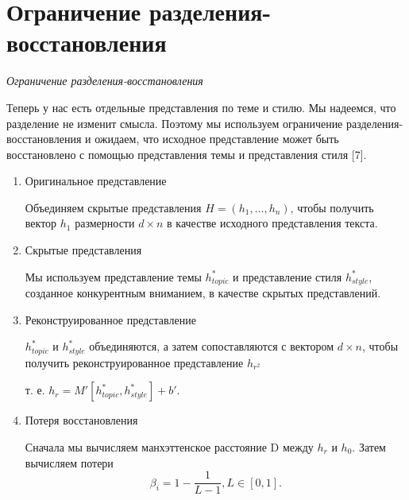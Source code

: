 \documentclass{article}
\begin{document}
\section{Ограничение разделения-восстановления}
\begin{center}
\emph{Ограничение разделения-восстановления}
\end{center}

Теперь у нас есть отдельные представления по теме и стилю. Мы надеемся, 
что разделение не изменит смысла. 
Поэтому мы используем ограничение разделения-восстановления и ожидаем, что исходное 
представление может быть восстановлено с помощью представления темы и представления стиля [7].
\begin{enumerate}[label={\arabic*)}, left=10pt]
    \item Оригинальное представление
    \par Объединяем скрытые представления $H = (h_1,\ldots,h_n)$, чтобы получить вектор $h_1$ размерности $d \times n$ в качестве исходного представления текста.
    \item Скрытые представления
    \par Мы используем представление темы $h^{*}_{topic}$
    и представление стиля $h^{*}_{style}$, созданное конкурентным вниманием, в качестве 
    скрытых представлений. 
    \item Реконструированное представление
    \par $h^{*}_{topic}$ и $h^{*}_{style}$ объединяются, а затем сопоставляются 
    с вектором $d \times n$, чтобы получить реконструированное представление $h_{r^2}$
    \par т. е. $h_r=M'[h^{*}_{topic}, h^{*}_{style}]+b'$.
    \item Потеря восстановления
    \par Сначала мы вычисляем манхэттенское расстояние D между $h_r$ и $h_0$.
    Затем вычисляем потери
    \begin{equation*}
        \beta_i = 1-\frac{1}{L-1}, L \in [0, 1].
    \end{equation*} 
\end{enumerate}
\end{document}
